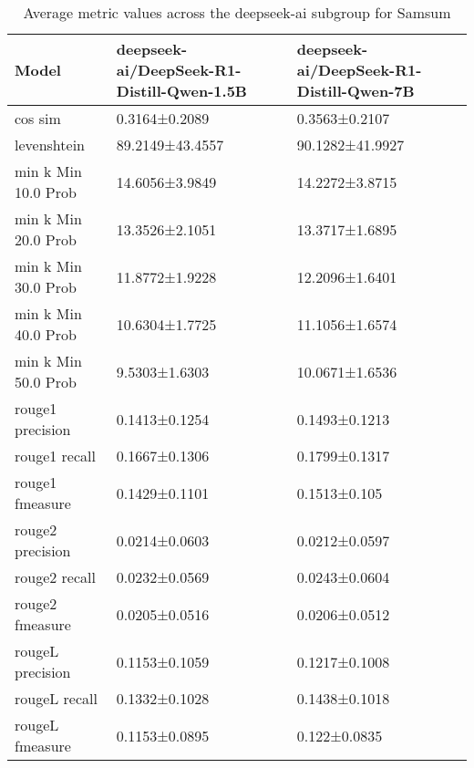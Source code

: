\begin{table}
\caption{Average metric values across the deepseek-ai subgroup for Samsum}
\label{tab:}
\begin{tabular}{lll}
\toprule
Model & deepseek-ai/DeepSeek-R1-Distill-Qwen-1.5B & deepseek-ai/DeepSeek-R1-Distill-Qwen-7B \\
\midrule
cos sim & 0.3164±0.2089 & 0.3563±0.2107 \\
levenshtein & 89.2149±43.4557 & 90.1282±41.9927 \\
min k Min 10.0 Prob & 14.6056±3.9849 & 14.2272±3.8715 \\
min k Min 20.0 Prob & 13.3526±2.1051 & 13.3717±1.6895 \\
min k Min 30.0 Prob & 11.8772±1.9228 & 12.2096±1.6401 \\
min k Min 40.0 Prob & 10.6304±1.7725 & 11.1056±1.6574 \\
min k Min 50.0 Prob & 9.5303±1.6303 & 10.0671±1.6536 \\
rouge1 precision & 0.1413±0.1254 & 0.1493±0.1213 \\
rouge1 recall & 0.1667±0.1306 & 0.1799±0.1317 \\
rouge1 fmeasure & 0.1429±0.1101 & 0.1513±0.105 \\
rouge2 precision & 0.0214±0.0603 & 0.0212±0.0597 \\
rouge2 recall & 0.0232±0.0569 & 0.0243±0.0604 \\
rouge2 fmeasure & 0.0205±0.0516 & 0.0206±0.0512 \\
rougeL precision & 0.1153±0.1059 & 0.1217±0.1008 \\
rougeL recall & 0.1332±0.1028 & 0.1438±0.1018 \\
rougeL fmeasure & 0.1153±0.0895 & 0.122±0.0835 \\
\bottomrule
\end{tabular}
\end{table}
